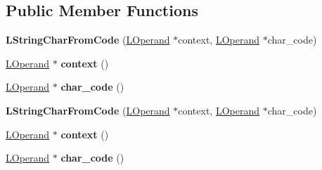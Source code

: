 \subsection*{Public Member Functions}
\begin{DoxyCompactItemize}
\item 
{\bfseries L\+String\+Char\+From\+Code} (\hyperlink{classv8_1_1internal_1_1_l_operand}{L\+Operand} $\ast$context, \hyperlink{classv8_1_1internal_1_1_l_operand}{L\+Operand} $\ast$char\+\_\+code)\hypertarget{classv8_1_1internal_1_1_l_string_char_from_code_a0b0f2d230156e96656bb7d58558684a4}{}\label{classv8_1_1internal_1_1_l_string_char_from_code_a0b0f2d230156e96656bb7d58558684a4}

\item 
\hyperlink{classv8_1_1internal_1_1_l_operand}{L\+Operand} $\ast$ {\bfseries context} ()\hypertarget{classv8_1_1internal_1_1_l_string_char_from_code_a4356472324b4b7a5d7ffebc9b5db601a}{}\label{classv8_1_1internal_1_1_l_string_char_from_code_a4356472324b4b7a5d7ffebc9b5db601a}

\item 
\hyperlink{classv8_1_1internal_1_1_l_operand}{L\+Operand} $\ast$ {\bfseries char\+\_\+code} ()\hypertarget{classv8_1_1internal_1_1_l_string_char_from_code_a93cc7e1f404a16531d549201415f09e1}{}\label{classv8_1_1internal_1_1_l_string_char_from_code_a93cc7e1f404a16531d549201415f09e1}

\item 
{\bfseries L\+String\+Char\+From\+Code} (\hyperlink{classv8_1_1internal_1_1_l_operand}{L\+Operand} $\ast$context, \hyperlink{classv8_1_1internal_1_1_l_operand}{L\+Operand} $\ast$char\+\_\+code)\hypertarget{classv8_1_1internal_1_1_l_string_char_from_code_a0b0f2d230156e96656bb7d58558684a4}{}\label{classv8_1_1internal_1_1_l_string_char_from_code_a0b0f2d230156e96656bb7d58558684a4}

\item 
\hyperlink{classv8_1_1internal_1_1_l_operand}{L\+Operand} $\ast$ {\bfseries context} ()\hypertarget{classv8_1_1internal_1_1_l_string_char_from_code_a4356472324b4b7a5d7ffebc9b5db601a}{}\label{classv8_1_1internal_1_1_l_string_char_from_code_a4356472324b4b7a5d7ffebc9b5db601a}

\item 
\hyperlink{classv8_1_1internal_1_1_l_operand}{L\+Operand} $\ast$ {\bfseries char\+\_\+code} ()\hypertarget{classv8_1_1internal_1_1_l_string_char_from_code_a93cc7e1f404a16531d549201415f09e1}{}\label{classv8_1_1internal_1_1_l_string_char_from_code_a93cc7e1f404a16531d549201415f09e1}


\end{DoxyCompactItemize}
